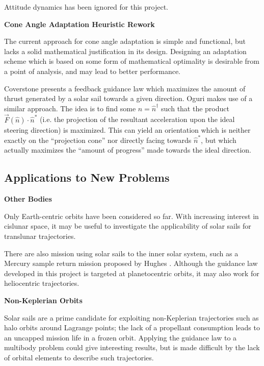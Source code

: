 Attitude dynamics has been ignored for this project.

\textbf{Cone Angle Adaptation Heuristic Rework}

The current approach for cone angle adaptation is simple and functional, but lacks a solid mathematical justification in its design. Designing an adaptation scheme which is based on some form of mathematical optimality is desirable from a point of analysis, and may lead to better performance.

Coverstone \cite{coverstone2003technique} presents a feedback guidance law which maximizes the amount of thrust generated by a solar sail towards a given direction. Oguri \cite{oguri2023solar} makes use of a similar approach. The idea is to find some \(\hat{n} = \hat{n}^\dagger\) such that the product \(\vec{F}(\hat{n}) \cdot \hat{n}^*\) (i.e. the projection of the resultant acceleration upon the ideal steering direction) is maximized. This can yield an orientation which is neither exactly on the ``projection cone'' nor directly facing towards \(\hat{n}^*\), but which actually maximizes the ``amount of progress'' made towards the ideal direction.



\subsection{Applications to New Problems}


\textbf{Other Bodies}

Only Earth-centric orbits have been considered so far. With increasing interest in cislunar space, it may be useful to investigate the applicability of solar sails for translunar trajectories.

There are also mission using solar sails to the inner solar system, such as a Mercury sample return mission proposed by Hughes \cite{hughes2006sample}. Although the guidance law developed in this project is targeted at planetocentric orbits, it may also work for heliocentric trajectories.

\textbf{Non-Keplerian Orbits}

Solar sails are a prime candidate for exploiting non-Keplerian trajectories such as halo orbits around Lagrange points; the lack of a propellant consumption leads to an uncapped mission life in a frozen orbit. Applying the guidance law to a multibody problem could give interesting results, but is made difficult by the lack of orbital elements to describe such trajectories.

